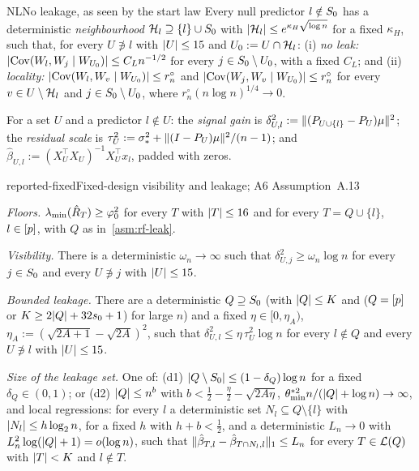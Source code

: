 \begin{assumption}{NL}{No leakage, as seen by the start law}
Every null predictor $l\notin S_0$ has a deterministic \emph{neighbourhood} $\mathcal H_l\supseteq\{l\}\cup S_0$ with
$\lvert \mathcal H_l\rvert\le e^{\kappa_H\sqrt{\log n}}$ for a fixed $\kappa_H$, such that, for every $U\not\ni l$ with $\lvert U\rvert\le15$ and
$U_0:=U\cap\mathcal H_l$: (i) \emph{no leak:} $\lvert \operatorname{Cov}(W_l,W_j\mid W_{U_0})\rvert\le C_Ln^{-1/2}$ for every $j\in S_0\setminus U_0$,
with a fixed $C_L$; and (ii) \emph{locality:} $\lvert \operatorname{Cov}(W_l,W_v\mid W_{U_0})\rvert\le r^\circ_n$ and
$\lvert \operatorname{Cov}(W_j,W_v\mid W_{U_0})\rvert\le r^\circ_n$ for every $v\in U\setminus\mathcal H_l$ and $j\in S_0\setminus U_0$, where
$r^\circ_n(n\log n)^{1/4}\to0$.
\end{assumption}

For a set $U$ and a predictor $l\notin U$: the \emph{signal gain} is $\delta^2_{U,l}:=\lVert (P_{U\cup\{l\}}-P_U)\mu\rVert^2$;
the \emph{residual scale} is $\tau^2_U:=\sigma_*^2+\lVert (I-P_U)\mu\rVert^2/(n-1)$; and $\hat\beta_{U,l}:=(X_U^\top X_U)^{-1}X_U^\top
x_l$, padded with zeros.

\begin{assumption}{reported-fixed}{Fixed-design visibility and leakage; A6 Assumption~A.13}
\begin{asmitems}
  \item\label{asm:rf-floor} \emph{Floors.} $\lambda_{\min}(\hat R_T)\ge\varphi_0^2$ for every $T$ with $\lvert T\rvert\le16$ and for every
    $T=Q\cup\{l\}$, $l\in[p]$, with $Q$ as in~\ref{asm:rf-leak}.
  \item\label{asm:rf-vis} \emph{Visibility.} There is a deterministic $\omega_n\to\infty$ such that
    $\delta^2_{U,j}\ge\omega_n\log n$ for every $j\in S_0$ and every $U\not\ni j$ with $\lvert U\rvert\le15$.
  \item\label{asm:rf-leak} \emph{Bounded leakage.} There are a deterministic $Q\supseteq S_0$ (with $\lvert Q\rvert\le K$ and
    ($Q=[p]$ or $K\ge2\lvert Q\rvert+32s_0+1$) for large $n$) and a fixed $\eta\in[0,\eta_A)$,
    $\eta_A:=(\sqrt{2A+1}-\sqrt{2A})^2$, such that $\delta^2_{U,l}\le\eta\,\tau^2_U\log n$ for every $l\notin Q$ and every
    $U\not\ni l$ with $\lvert U\rvert\le15$.
  \item\label{asm:rf-size} \emph{Size of the leakage set.} One of: (d1) $\lvert Q\setminus S_0\rvert\le(1-\delta_Q)\log n$ for a
    fixed $\delta_Q\in(0,1)$; or (d2) $\lvert Q\rvert\le n^b$ with $b<\tfrac12-\tfrac\eta2-\sqrt{2A\eta}$,
    $\theta^{*2}_{\min}n/(\lvert Q\rvert+\log n)\to\infty$, and local regressions: for every $l$ a deterministic set
    $N_l\subseteq Q\setminus\{l\}$ with $\lvert N_l\rvert\le h\log_2n$, for a fixed $h$ with $h+b<\tfrac12$, and a deterministic
    $L_n\to0$ with $L_n^2\log(\lvert Q\rvert+1)=o(\log n)$, such that $\lVert \hat\beta_{T,l}-\hat\beta_{T\cap N_l,l}\rVert_1\le L_n$
    for every $T\in\mathcal L(Q)$ with $\lvert T\rvert<K$ and $l\notin T$.
\end{asmitems}
\end{assumption}

